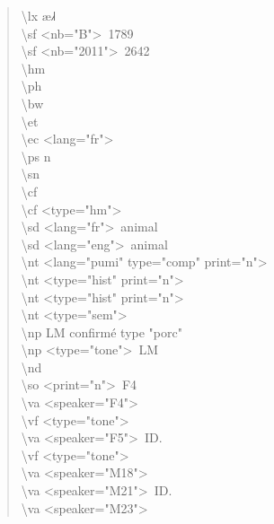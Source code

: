 \documentclass[a4paper,12pt]{article}
\newcommand{\ipa}[1]{{\phon #1}}
\begin{document}
\pagebreak

\begin{quote}
\textbackslash lx \ipa{æ˩˧} \\
\textbackslash sf \textless nb="B"\textgreater~1789 \\
\textbackslash sf \textless nb="2011"\textgreater~2642 \\
\textbackslash hm \\
\textbackslash ph \\
\textbackslash bw \\
\textbackslash et \\
\textbackslash ec \textless lang="fr"\textgreater \\
\textbackslash ps n \\
\textbackslash sn \\
\textbackslash cf \\
\textbackslash cf \textless type="hm"\textgreater \\ 
\textbackslash sd \textless lang="fr"\textgreater~animal \\
\textbackslash sd \textless lang="eng"\textgreater~animal \\
\textbackslash nt \textless lang="pumi" type="comp" print="n"\textgreater \\
\textbackslash nt \textless type="hist" print="n"\textgreater \\
\textbackslash nt \textless type="hist" print="n"\textgreater \\
\textbackslash nt \textless type="sem"\textgreater \\
\textbackslash np LM confirmé type "porc" \\
\textbackslash np \textless type="tone"\textgreater~LM \\
\textbackslash nd \\
\textbackslash so \textless print="n"\textgreater~F4 \\
\textbackslash va \textless speaker="F4"\textgreater \\
\textbackslash vf \textless type="tone"\textgreater \\
\textbackslash va \textless speaker="F5"\textgreater~ID. \\
\textbackslash vf \textless type="tone"\textgreater \\
\textbackslash va \textless speaker="M18"\textgreater \\
\textbackslash va \textless speaker="M21"\textgreater~ID. \\
\textbackslash va \textless speaker="M23"\textgreater \\

\end{quote}
\end{document}
